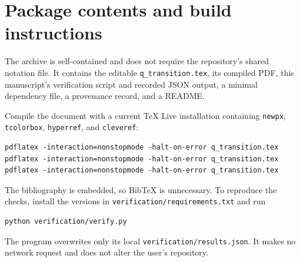 \documentclass[11pt,a4paper]{article}
\numberwithin{equation}{section}
\theoremstyle{plain}
\theoremstyle{definition}
\theoremstyle{remark}
\begin{document}
\section{Package contents and build instructions}
\label{app:build}

The archive is self-contained and does not require the repository's shared
notation file. It contains the editable \texttt{q\_transition.tex}, its
compiled PDF, this manuscript's verification script and recorded JSON output,
a minimal dependency file, a provenance record, and a README.

Compile the document with a current TeX Live installation containing
\texttt{newpx}, \texttt{tcolorbox}, \texttt{hyperref}, and \texttt{cleveref}:
\begin{verbatim}
pdflatex -interaction=nonstopmode -halt-on-error q_transition.tex
pdflatex -interaction=nonstopmode -halt-on-error q_transition.tex
pdflatex -interaction=nonstopmode -halt-on-error q_transition.tex
\end{verbatim}
The bibliography is embedded, so BibTeX is unnecessary. To reproduce the
checks, install the versions in \texttt{verification/requirements.txt} and run
\begin{verbatim}
python verification/verify.py
\end{verbatim}
The program overwrites only its local \texttt{verification/results.json}.
It makes no network request and does not alter the user's repository.
\end{document}
